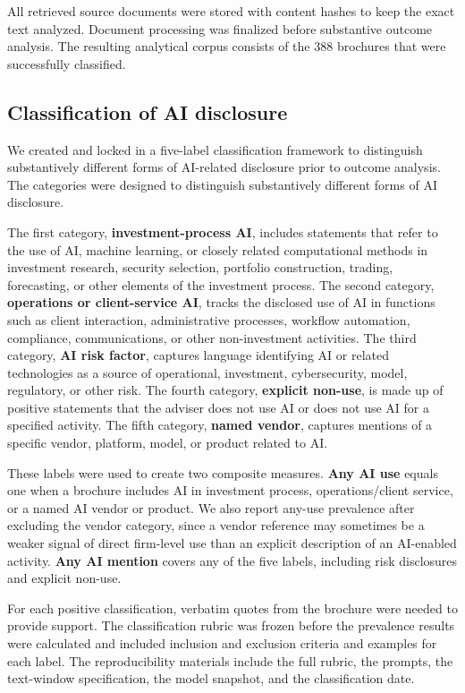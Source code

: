 \documentclass[utf8]{FrontiersinHarvard}
\begin{document}
All retrieved source documents were stored with content hashes to keep the exact text analyzed. Document processing was finalized before substantive outcome analysis. The resulting analytical corpus consists of the 388 brochures that were successfully classified.

\subsection{Classification of AI disclosure}

We created and locked in a five-label classification framework to distinguish substantively different forms of AI-related disclosure prior to outcome analysis. The categories were designed to distinguish substantively different forms of AI disclosure.

The first category, \textbf{investment-process AI}, includes statements that refer to the use of AI, machine learning, or closely related computational methods in investment research, security selection, portfolio construction, trading, forecasting, or other elements of the investment process. The second category, \textbf{operations or client-service AI}, tracks the disclosed use of AI in functions such as client interaction, administrative processes, workflow automation, compliance, communications, or other non-investment activities. The third category, \textbf{AI risk factor}, captures language identifying AI or related technologies as a source of operational, investment, cybersecurity, model, regulatory, or other risk. The fourth category, \textbf{explicit non-use}, is made up of positive statements that the adviser does not use AI or does not use AI for a specified activity. The fifth category, \textbf{named vendor}, captures mentions of a specific vendor, platform, model, or product related to AI.

These labels were used to create two composite measures. \textbf{Any AI use} equals one when a brochure includes AI in investment process, operations/client service, or a named AI vendor or product. We also report any-use prevalence after excluding the vendor category, since a vendor reference may sometimes be a weaker signal of direct firm-level use than an explicit description of an AI-enabled activity. \textbf{Any AI mention} covers any of the five labels, including risk disclosures and explicit non-use.

For each positive classification, verbatim quotes from the brochure were needed to provide support. The classification rubric was frozen before the prevalence results were calculated and included inclusion and exclusion criteria and examples for each label. The reproducibility materials include the full rubric, the prompts, the text-window specification, the model snapshot, and the classification date.
\end{document}
